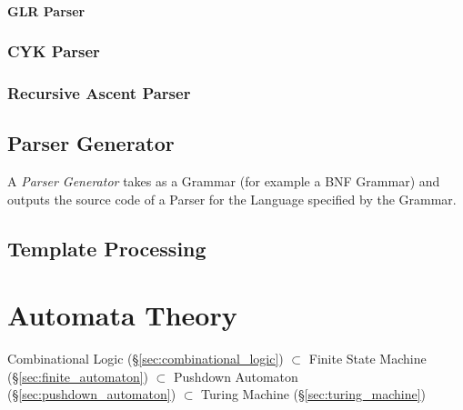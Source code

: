 \paragraph{GLR Parser}\label{sec:glr_parser}\hfill



\subsubsection{CYK Parser}\label{sec:cyk_parser}

\subsubsection{Recursive Ascent Parser}\label{sec:recursive_ascent}



\subsection{Parser Generator}\label{sec:parser_generator}

A \emph{Parser Generator} takes as a Grammar (for example a BNF
Grammar) and outputs the source code of a Parser for the Language
specified by the Grammar.



\subsection{Template Processing}\label{sec:template_processing}



\section{Automata Theory}\label{sec:automata_theory}


Combinational Logic (\S\ref{sec:combinational_logic})
$\subset$ Finite State Machine (\S\ref{sec:finite_automaton})
$\subset$ Pushdown Automaton (\S\ref{sec:pushdown_automaton})
$\subset$ Turing Machine (\S\ref{sec:turing_machine})

